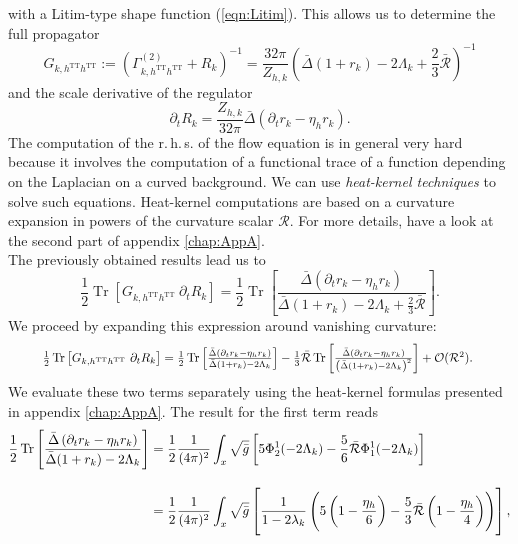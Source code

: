 with a Litim-type shape function (\ref{eqn:Litim}). This allows us to determine the full propagator
\begin{equation}
	G_{k, h^{\text{TT}}h^{\text{TT}}} := \left(\Gamma_{k, h^{\text{TT}}h^{\text{TT}}}^{(2)} + R_k\right)^{-1} = \frac{32\pi}{Z_{h,k}}\left(\bar{\Delta}\left(1+r_k\right) -2\Lambda_k + \frac{2}{3}\bar{\mathcal{R}}\right)^{-1}
\end{equation}
and the scale derivative of the regulator
\begin{equation}
	\partial_t R_k =  \frac{Z_{h,k}}{32\pi}\bar{\Delta}\left(\partial_tr_k - \eta_hr_k\right).
\end{equation}
The computation of the r.\,h.\,s. of the flow equation is in general very hard because it involves the computation of a functional trace of a function depending on the Laplacian on a curved background. We can use \textit{heat-kernel techniques} to solve such equations. Heat-kernel computations are based on a curvature expansion in powers of the curvature scalar $\mathcal{R}$. For more details, have a look at the second part of appendix \ref{chap:AppA}.\\
The previously obtained results lead us to
\begin{equation}
\frac{1}{2}\operatorname{Tr}\left[G_{k, h^{\text{TT}}h^{\text{TT}}}\ \partial_t R_k\right] = \frac{1}{2}\operatorname{Tr}\left[\frac{\bar{\Delta}\left(\partial_t r_k - \eta_h r_k\right)}{\bar{\Delta}(1+r_k)-2\Lambda_k+\frac{2}{3}\bar{\mathcal{R}}}\right].
\end{equation}
We proceed by expanding this expression around vanishing curvature:
\begin{align}
\resizebox{.9 \textwidth}{!}{$
\frac{1}{2}\operatorname{Tr}\left[G_{k, h^{\text{TT}}h^{\text{TT}}}\ \partial_t R_k\right] = \frac{1}{2}\operatorname{Tr}\left[\frac{\bar{\Delta}\left(\partial_t r_k - \eta_h r_k\right)}{\bar{\Delta}(1+r_k)-2\Lambda_k}\right] - \frac{1}{3}\bar{\mathcal{R}}\operatorname{Tr}\left[\frac{\bar{\Delta}\left(\partial_t r_k - \eta_h r_k\right)}{\left(\bar{\Delta}(1+r_k)-2\Lambda_k\right)^2}\right] + \mathcal{O}(\mathcal{R}^2).$
}
\end{align}
We evaluate these two terms separately using the heat-kernel formulas presented in appendix \ref{chap:AppA}. The result for the first term reads
\begin{align}
\frac{1}{2}\operatorname{Tr}\left[\frac{\bar{\Delta}\left(\partial_t r_k - \eta_h r_k\right)}{\bar{\Delta}(1+r_k)-2\Lambda_k}\right] &= \frac{1}{2}\frac{1}{(4\pi)^2}\int_x \sqrt{\bar{g}} \left[5\Phi_2^1(-2\Lambda_k) - \frac{5}{6}\bar{\mathcal{R}}\Phi^1_1(-2\Lambda_k)\right] \\[10pt]
&= \frac{1}{2}\frac{1}{(4\pi)^2}\int_x \sqrt{\bar{g}}\left[\frac{1}{1-2\lambda_k}\left(5\left(1-\frac{\eta_h}{6}\right) - \frac{5}{3}\bar{\mathcal{R}}\left(1-\frac{\eta_h}{4}\right)\right)\right],\nonumber
\label{eqn:hk41_test}
\end{align}

